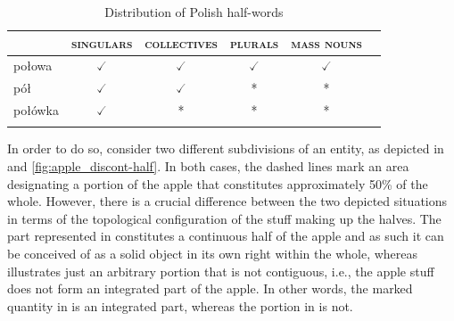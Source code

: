 		\begin{table}[h!]
			\centering
			\begin{tabular}{lccccc}
				\lsptoprule
				& \textsc{singulars} & \textsc{collectives} & \textsc{plurals} & \textsc{mass nouns} \\ \midrule
				połowa  & $\checked$ & $\checked$ & $\checked$ & $\checked$ \\
				pół     & $\checked$ & $\checked$    & * & * \\
				połówka & $\checked$ & * & * & * \\ \lspbottomrule
			\end{tabular}
			\caption{Distribution of Polish half-words}\label{tab:distribution-of-polish-half-words}
		\end{table}

In order to do so, consider two different subdivisions of an entity, as depicted in  and \ref{fig:apple_discont-half}. In both cases, the dashed lines mark an area designating a portion of the apple that constitutes approximately 50\% of the whole. However, there is a crucial difference between the two depicted situations in terms of the topological configuration of the stuff making up the halves. The part represented in  constitutes a continuous half of the apple and as such it can be conceived of as a solid object in its own right within the whole, whereas  illustrates just an arbitrary portion that is not contiguous, i.e., the apple stuff does not form an integrated part of the apple. In other words, the marked quantity in  is an integrated part, whereas the portion in  is not.


